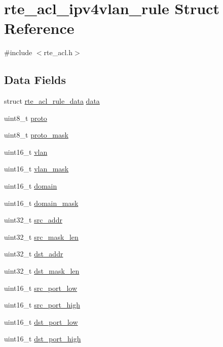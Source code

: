 \hypertarget{structrte__acl__ipv4vlan__rule}{}\section{rte\+\_\+acl\+\_\+ipv4vlan\+\_\+rule Struct Reference}
\label{structrte__acl__ipv4vlan__rule}


{\ttfamily \#include $<$rte\+\_\+acl.\+h$>$}

\subsection*{Data Fields}
\begin{DoxyCompactItemize}
\item 
struct \hyperlink{structrte__acl__rule__data}{rte\+\_\+acl\+\_\+rule\+\_\+data} \hyperlink{structrte__acl__ipv4vlan__rule_a99051b6359c64a7d62ba690eb050c203}{data}
\item 
uint8\+\_\+t \hyperlink{structrte__acl__ipv4vlan__rule_adaae928b69788f774db092e75f1c4fb7}{proto}
\item 
uint8\+\_\+t \hyperlink{structrte__acl__ipv4vlan__rule_a891d8676f4217b7c83d29bca71789d42}{proto\+\_\+mask}
\item 
uint16\+\_\+t \hyperlink{structrte__acl__ipv4vlan__rule_a92937e69e9229d22ff399ab3dc050fd2}{vlan}
\item 
uint16\+\_\+t \hyperlink{structrte__acl__ipv4vlan__rule_a98c97ee3f299909e11bafad60ea53215}{vlan\+\_\+mask}
\item 
uint16\+\_\+t \hyperlink{structrte__acl__ipv4vlan__rule_a71f5a95cafc58280f7afe1de6dfd98a2}{domain}
\item 
uint16\+\_\+t \hyperlink{structrte__acl__ipv4vlan__rule_a6c8cf15b815bc8e583473ff09b25e02f}{domain\+\_\+mask}
\item 
uint32\+\_\+t \hyperlink{structrte__acl__ipv4vlan__rule_a6a462ff6ecd832025b4f8934f226d5b5}{src\+\_\+addr}
\item 
uint32\+\_\+t \hyperlink{structrte__acl__ipv4vlan__rule_a1e19471126b4f8bee1b90efc236c62fb}{src\+\_\+mask\+\_\+len}
\item 
uint32\+\_\+t \hyperlink{structrte__acl__ipv4vlan__rule_ad3367f6b5057b9c73b012338e5a437ae}{dst\+\_\+addr}
\item 
uint32\+\_\+t \hyperlink{structrte__acl__ipv4vlan__rule_a3b273e3c0e991e866341a9e8d095488a}{dst\+\_\+mask\+\_\+len}
\item 
uint16\+\_\+t \hyperlink{structrte__acl__ipv4vlan__rule_a0331a6c2640bae85f6cc6d5871159fb7}{src\+\_\+port\+\_\+low}
\item 
uint16\+\_\+t \hyperlink{structrte__acl__ipv4vlan__rule_aa63ab325626a166191911278c308b65a}{src\+\_\+port\+\_\+high}
\item 
uint16\+\_\+t \hyperlink{structrte__acl__ipv4vlan__rule_a7a477205a3b788d9300aefa5e09db9a2}{dst\+\_\+port\+\_\+low}
\item 
uint16\+\_\+t \hyperlink{structrte__acl__ipv4vlan__rule_ae8e95d2218ccc7afdc833346e14f5dc6}{dst\+\_\+port\+\_\+high}
\end{DoxyCompactItemize}


